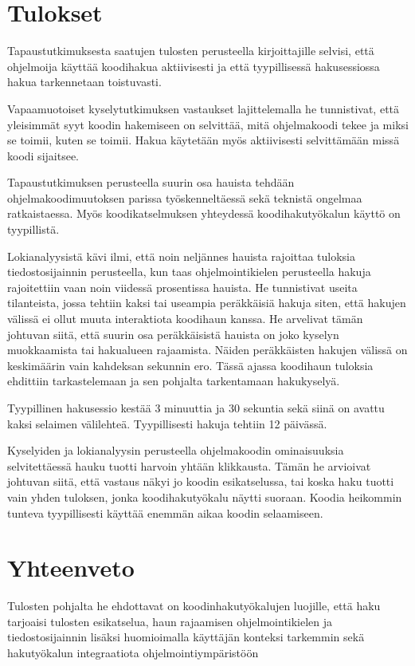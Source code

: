 \documentclass[finnish]{../tktltiki2}
\theoremstyle{definition}
\theoremstyle{remark}
\begin{document}
\section{Tulokset}

Tapaustutkimuksesta saatujen tulosten perusteella kirjoittajille selvisi, että ohjelmoija käyttää koodihakua aktiivisesti ja että tyypillisessä hakusessiossa hakua tarkennetaan toistuvasti.

Vapaamuotoiset kyselytutkimuksen vastaukset lajittelemalla he tunnistivat, että yleisimmät syyt koodin hakemiseen on selvittää, mitä ohjelmakoodi tekee ja miksi se toimii, kuten se toimii. Hakua käytetään myös aktiivisesti selvittämään missä koodi sijaitsee.

Tapaustutkimuksen perusteella suurin osa hauista tehdään ohjelmakoodimuutoksen parissa työskenneltäessä sekä teknistä ongelmaa ratkaistaessa. Myös koodikatselmuksen yhteydessä koodihakutyökalun käyttö on tyypillistä.

Lokianalyysistä kävi ilmi, että noin neljännes hauista rajoittaa tuloksia tiedostosijainnin perusteella, kun taas ohjelmointikielen perusteella hakuja rajoitettiin vaan noin viidessä prosentissa hauista.
He tunnistivat useita tilanteista, jossa tehtiin kaksi tai useampia peräkkäisiä hakuja siten, että hakujen välissä ei ollut muuta interaktiota koodihaun kanssa. He arvelivat tämän johtuvan siitä, että suurin osa peräkkäisistä hauista on joko kyselyn muokkaamista tai hakualueen rajaamista. Näiden peräkkäisten hakujen välissä on keskimäärin vain kahdeksan sekunnin ero. Tässä ajassa koodihaun tuloksia ehdittiin tarkastelemaan ja sen pohjalta tarkentamaan hakukyselyä.

Tyypillinen hakusessio kestää 3 minuuttia ja 30 sekuntia sekä siinä on avattu kaksi selaimen välilehteä. Tyypillisesti hakuja tehtiin 12 päivässä.

Kyselyiden ja lokianalyysin perusteella ohjelmakoodin ominaisuuksia selvitettäessä hauku tuotti harvoin yhtään klikkausta. Tämän he arvioivat johtuvan siitä, että vastaus näkyi jo koodin esikatselussa, tai koska haku tuotti vain yhden tuloksen, jonka koodihakutyökalu näytti suoraan.
Koodia heikommin tunteva tyypillisesti käyttää enemmän aikaa koodin selaamiseen.

\section{Yhteenveto}

Tulosten pohjalta he ehdottavat on koodinhakutyökalujen luojille, että haku tarjoaisi tulosten esikatselua, haun rajaamisen ohjelmointikielen ja tiedostosijainnin lisäksi huomioimalla käyttäjän konteksi tarkemmin sekä hakutyökalun integraatiota ohjelmointiympäristöön
\end{document}
